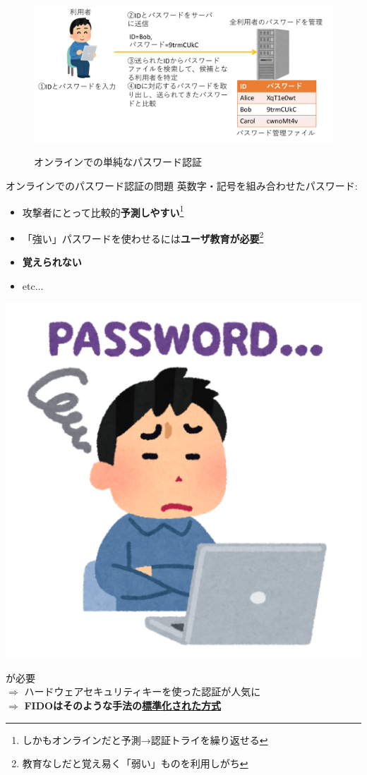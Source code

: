 \documentclass[12pt,dvipdfmx,uplatex]{beamer}
\begin{document}
\begin{frame}
\begin{figure}
\centering
\includegraphics[width=\linewidth]{Figs/password-auth.pdf}\\
\caption{オンラインでの単純なパスワード認証}
\end{figure}
\end{frame}


\begin{frame}{オンラインでのパスワード認証の問題}
英数字・記号を組み合わせたパスワード:
\begin{itemize}
 \item 攻撃者にとって比較的\textbf{予測しやすい}\footnote[frame]{\scriptsize しかもオンラインだと予測→認証トライを繰り返せる}
 \item 「強い」パスワードを使わせるには\textbf{ユーザ教育が必要}\footnote[frame]{\scriptsize 教育なしだと覚え易く「弱い」ものを利用しがち}
 \item \textbf{覚えられない}
 \item etc...
\end{itemize}

\vspace{-5ex}
\begin{center}
\includegraphics[width=0.2\linewidth]{Figs/password-forget.pdf}
\end{center}
\vspace{-2ex}

が必要\\
$\Rightarrow$ \alert{ハードウェアセキュリティキーを使った認証}が人気に\\
$\Rightarrow$ \textbf{FIDOはそのような手法の\ul{標準化された方式}}

\end{frame}
\end{document}
